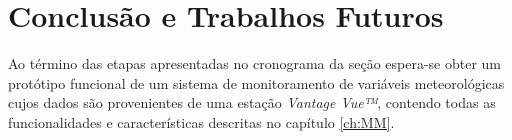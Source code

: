 \chapter{Conclusão e Trabalhos Futuros}

Ao término das etapas apresentadas no cronograma da seção  espera-se obter um protótipo funcional de um sistema de monitoramento de variáveis meteorológicas cujos dados são provenientes de uma estação \textit{Vantage Vue™}, contendo todas as funcionalidades e características descritas no capítulo \ref{ch:MM}.
